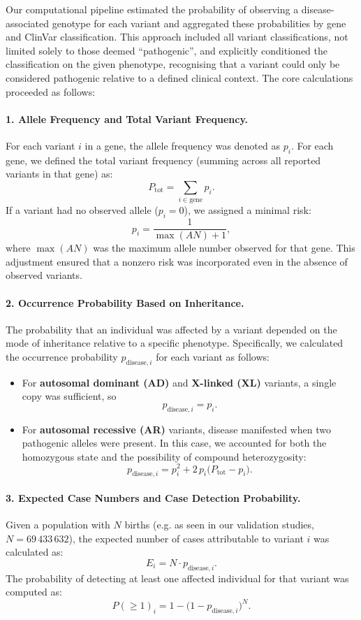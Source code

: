 Our computational pipeline estimated the probability of observing a disease-associated genotype for each variant and aggregated these probabilities by gene and ClinVar classification. This approach included all variant classifications, not limited solely to those deemed ``pathogenic'', and explicitly conditioned the classification on the given phenotype, recognising that a variant could only be considered pathogenic relative to a defined clinical context. The core calculations proceeded as follows:

\paragraph{1. Allele Frequency and Total Variant Frequency.}
For each variant \(i\) in a gene, the allele frequency was denoted as \(p_i\). For each gene, we defined the total variant frequency (summing across all reported variants in that gene) as:
\[
P_{\text{tot}} = \sum_{i \in \text{gene}} p_i.
\]
If a variant had no observed allele (\(p_i = 0\)), we assigned a minimal risk:
\[
p_i = \frac{1}{\max(AN) + 1},
\]
where \(\max(AN)\) was the maximum allele number observed for that gene. This adjustment ensured that a nonzero risk was incorporated even in the absence of observed variants.
\paragraph{2. Occurrence Probability Based on Inheritance.}
The probability that an individual was affected by a variant depended on the mode of inheritance relative to a specific phenotype. Specifically, we calculated the occurrence probability \(p_{\text{disease},i}\) for each variant as follows:
\begin{itemize}
    \item For \textbf{autosomal dominant (AD)} and \textbf{X-linked (XL)} variants, a single copy was sufficient, so
    \[
    p_{\text{disease},i} = p_i.
    \]
    \item For \textbf{autosomal recessive (AR)} variants, disease manifested when two pathogenic alleles were present. In this case, we accounted for both the homozygous state and the possibility of compound heterozygosity:
    \[
    p_{\text{disease},i} = p_i^2 + 2\,p_i\bigl(P_{\text{tot}} - p_i\bigr).
    \]
\end{itemize}

\paragraph{3. Expected Case Numbers and Case Detection Probability.}
Given a population with \(N\) births (e.g. as seen in our validation studies, \(N = 69\,433\,632\)), the expected number of cases attributable to variant \(i\) was calculated as:
\[
E_i = N \cdot p_{\text{disease},i}.
\]
The probability of detecting at least one affected individual for that variant was computed as:
\[
P(\geq 1)_i = 1 - \bigl(1 - p_{\text{disease},i}\bigr)^N.
\]

